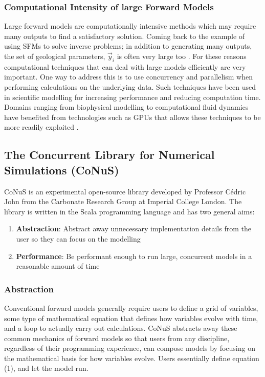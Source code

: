 \documentclass[12pt]{article}
\begin{document}
\subsubsection{Computational Intensity of large Forward Models}
Large forward models are computationally intensive methods which may require many outputs to find a satisfactory solution. Coming back to the example of using SFMs to solve inverse problems; in addition to generating many outputs, the set of geological parameters, $\vec y_i$ is often very large too \cite{10.1260/0144598011492363}. For these reasons computational techniques that can deal with large models efficiently are very important. One way to address this is to use concurrency and parallelism when performing calculations on the underlying data. Such techniques have been used in scientific modelling for increasing performance and reducing computation time. Domains ranging from biophysical modelling to computational fluid dynamics have benefited from technologies such as GPUs that allows these techniques to be more readily exploited \cite{4490127}.

\subsection{The Concurrent Library for Numerical Simulations (CoNuS)}
CoNuS is an experimental open-source library developed by Professor Cédric John from the Carbonate Research Group at Imperial College London. The library is written in the Scala programming language and has two general aims:

\begin{enumerate}
\item \textbf{Abstraction}: Abstract away unnecessary implementation details from the user so they can focus on the modelling \\
\item \textbf{Performance}: Be performant enough to run large, concurrent models in a reasonable amount of time
\end{enumerate}

\subsubsection{Abstraction}
Conventional forward models generally require users to define a grid of variables, some type of mathematical equation that defines how variables evolve with time, and a loop to actually carry out calculations. CoNuS abstracts away these common mechanics of forward models so that users from any discipline, regardless of their programming experience, can compose models by focusing on the mathematical basis for how variables evolve. Users essentially define equation (1), and let the model run.
\end{document}
